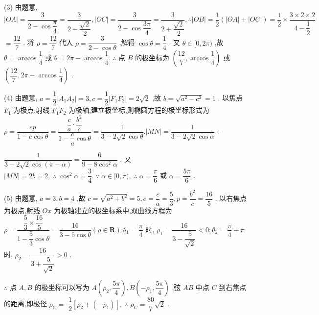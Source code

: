 (3) 由题意, $\left| {OA}\right|  = \dfrac{3}{2 - \cos \dfrac{\pi }{4}} = \dfrac{3}{2 - \dfrac{\sqrt{2}}{2}},\left| {OC}\right|  = \dfrac{3}{2 - \cos \dfrac{3\pi }{4}} = \dfrac{3}{2 + \dfrac{\sqrt{2}}{2}},\therefore \left| {OB}\right|  = \dfrac{1}{2}\left( {\left| {OA}\right|  + \left| {OC}\right| }\right)  = \dfrac{1}{2} \times  \dfrac{3 \times  2 \times  2}{4 - \dfrac{1}{2}}$  $= \dfrac{12}{7}$ . 将 $\rho  = \dfrac{12}{7}$ 代入 $\rho  = \dfrac{3}{2 - \cos \theta }$ ,解得 $\cos \theta  = \dfrac{1}{4}$ . 又 $\theta  \in  \lbrack 0,{2\pi })$ ,故 $\theta  = \arccos \dfrac{1}{4}$ 或 $\theta  = {2\pi } - \arccos \dfrac{1}{4}.\;\therefore$ 点 $B$ 的极坐标为 $\left( {\dfrac{12}{7},\arccos \dfrac{1}{4}}\right)$ 或 $\left( {\dfrac{12}{7},{2\pi } - \arccos \dfrac{1}{4}}\right)$ .

(4) 由题意, $a = \dfrac{1}{2}\left| {{A}_{1}{A}_{2}}\right|  = 3,c = \dfrac{1}{2}\left| {{F}_{1}{F}_{2}}\right|  = 2\sqrt{2}$ ,故 $b = \sqrt{{a}^{2} - {c}^{2}} = 1$ . 以焦点 ${F}_{1}$ 为极点,射线 ${F}_{1}{F}_{2}$ 为极轴,建立极坐标,则椭圆方程的极坐标形式为 $\rho  = \dfrac{ep}{1 - e\cos \theta } = \dfrac{\dfrac{c}{a} \cdot  \dfrac{{b}^{2}}{c}}{1 - \dfrac{c}{a}\cos \theta } = \dfrac{1}{3 - 2\sqrt{2}\cos \theta }.\left| {MN}\right|  = \dfrac{1}{3 - 2\sqrt{2}\cos \alpha } +$

$\dfrac{1}{3 - 2\sqrt{2}\cos \left( {\pi  - \alpha }\right) } = \dfrac{6}{9 - 8{\cos }^{2}\alpha }$ . 又 $\left| {MN}\right|  = {2b} = 2,\;\therefore \;{\cos }^{2}\alpha  = \dfrac{3}{4}.\;\because \;\alpha  \in  \lbrack 0,\pi ),\;\therefore \;\alpha  = \dfrac{\pi }{6}$ 或 $\alpha  = \dfrac{5\pi }{6}$ .

(5) 由题意, $a = 3,b = 4$ ,故 $c = \sqrt{{a}^{2} + {b}^{2}} = 5,e = \dfrac{c}{a} = \dfrac{5}{3},p = \dfrac{{b}^{2}}{c} = \dfrac{16}{5}$ . 以右焦点为极点,射线 ${Ox}$ 为极轴建立的极坐标系中,双曲线方程为 $\rho  = \dfrac{\dfrac{5}{3} \times  \dfrac{16}{5}}{1 - \dfrac{5}{3}\cos \theta } = \dfrac{16}{3 - 5\cos \theta }\left( {\rho  \in  \mathbf{R}}\right) .{\theta }_{1} = \dfrac{\pi }{4}$ 时, ${\rho }_{1} = \dfrac{16}{3 - \dfrac{5}{\sqrt{2}}} < 0;{\theta }_{2} = \dfrac{\pi }{4} + \pi$ 时, ${\rho }_{2} = \dfrac{16}{3 + \dfrac{5}{\sqrt{2}}} > 0$ .

$\therefore$ 点 $A,B$ 的极坐标可以写为 $A\left( {{\rho }_{2},\dfrac{5\pi }{4}}\right) ,B\left( {-{\rho }_{1},\dfrac{5\pi }{4}}\right)$ ,弦 ${AB}$ 中点 $C$ 到右焦点的距离,即极径 ${\rho }_{C} =$  $\dfrac{1}{2}\left\lbrack  {{\rho }_{2} + \left( {-{\rho }_{1}}\right) }\right\rbrack  ,\;\therefore \;{\rho }_{C} = \dfrac{80}{7}\sqrt{2}$ .

